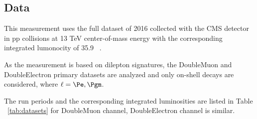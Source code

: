 
\subsection{Data}
This measurement uses the full dataset of 2016 collected with the CMS detector in pp collisions
at 13 TeV center-of-mass energy with the corresponding integrated lumonocity of 35.9 ~\fbinv. 

As the measurement is based on dilepton signatures, the DoubleMuon and DoubleElectron primary
datasets are analyzed and only on-shell \Zll decays are considered, where $\ell=\Pe, \Pgm$.
 
The run periods and the corresponding integrated luminosities are listed in Table ~\ref{tab:datasets} for DoubleMuon channel, DoubleElectron channel is similar.
\begin{table}[htbp]
\caption{List of used 2016 DoubleMuon data sets.
An uncertainty of $2.5\%$ is  assigned for the 2016 data set luminosity~\cite{lumiUnc}}

\label{tab:datasets}
\begin{center}
\end{center}
\end{table}

